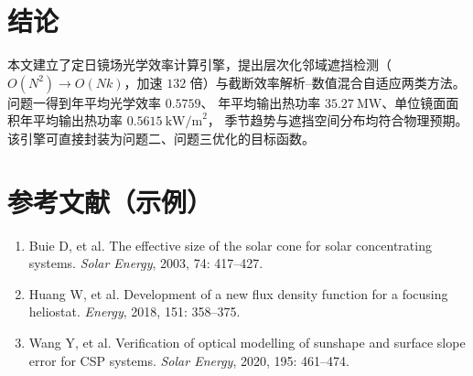\documentclass[12pt,a4paper]{ctexart}
\begin{document}
\section{结论}
本文建立了定日镜场光学效率计算引擎，提出层次化邻域遮挡检测（$O(N^2)\to O(Nk)$，加速
$132$ 倍）与截断效率解析--数值混合自适应两类方法。问题一得到年平均光学效率 $0.5759$、
年平均输出热功率 $35.27\ \text{MW}$、单位镜面面积年平均输出热功率 $0.5615\ \text{kW/m}^2$，
季节趋势与遮挡空间分布均符合物理预期。该引擎可直接封装为问题二、问题三优化的目标函数。

\section*{参考文献（示例）}
\begin{enumerate}
  \item Buie D, et al. The effective size of the solar cone for solar concentrating systems. \emph{Solar Energy}, 2003, 74: 417--427.
  \item Huang W, et al. Development of a new flux density function for a focusing heliostat. \emph{Energy}, 2018, 151: 358--375.
  \item Wang Y, et al. Verification of optical modelling of sunshape and surface slope error for CSP systems. \emph{Solar Energy}, 2020, 195: 461--474.
\end{enumerate}
\end{document}

